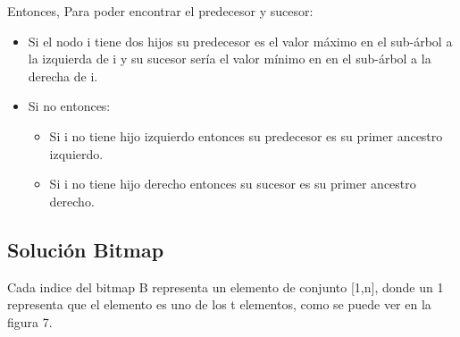 \documentclass[11pt]{article}
\begin{document}
Entonces, Para poder encontrar el predecesor y sucesor:
\begin{itemize}
\item Si el nodo i tiene dos hijos su predecesor es el valor máximo en el sub-árbol a la izquierda de i y su sucesor sería el valor mínimo en en el sub-árbol a la derecha de i.
\item Si no entonces:
\begin{itemize}
\item Si i no tiene hijo izquierdo entonces su predecesor es su primer ancestro izquierdo.
\item Si i no tiene hijo derecho entonces su sucesor es su primer ancestro derecho.
\end{itemize}
\end{itemize}
\subsection{Solución Bitmap}
Cada indice del bitmap B representa un elemento de conjunto [1,n], donde un 1 representa que el elemento es uno de los t elementos, como se puede ver en la figura 7.\\
\end{document}
